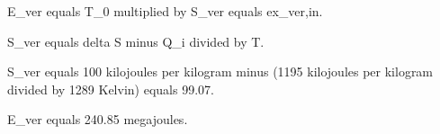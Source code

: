 E_ver equals T_0 multiplied by S_ver equals ex_ver,in.  

S_ver equals delta S minus Q_i divided by T.  

S_ver equals 100 kilojoules per kilogram minus (1195 kilojoules per kilogram divided by 1289 Kelvin) equals 99.07.  

E_ver equals 240.85 megajoules.